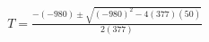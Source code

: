 \documentclass[preview]{standalone}
\begin{document}
\begin{align*}
T = \frac{-(-980) \pm \sqrt{(-980)^2 - 4(377)(50)}}{2(377)}
\end{align*}
\end{document}
